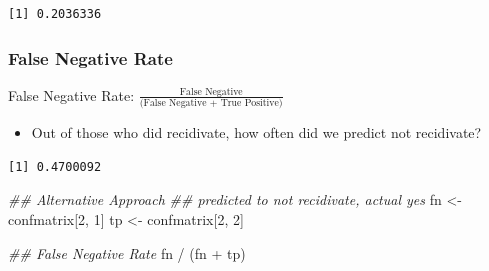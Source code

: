 \documentclass[
  letterpaper,
  DIV=11,
  numbers=noendperiod]{scrreprt}
\newenvironment{Shaded}{\begin{snugshade}}{\end{snugshade}}
\newcommand{\CommentTok}[1]{\textcolor[rgb]{0.37,0.37,0.37}{#1}}
\newcommand{\DecValTok}[1]{\textcolor[rgb]{0.68,0.00,0.00}{#1}}
\newcommand{\DocumentationTok}[1]{\textcolor[rgb]{0.37,0.37,0.37}{\textit{#1}}}
\newcommand{\FunctionTok}[1]{\textcolor[rgb]{0.28,0.35,0.67}{#1}}
\newcommand{\NormalTok}[1]{\textcolor[rgb]{0.00,0.23,0.31}{#1}}
\newcommand{\OtherTok}[1]{\textcolor[rgb]{0.00,0.23,0.31}{#1}}
\newcommand{\SpecialCharTok}[1]{\textcolor[rgb]{0.37,0.37,0.37}{#1}}
\providecommand{\tightlist}{%
  \setlength{\itemsep}{0pt}\setlength{\parskip}{0pt}}\usepackage{longtable,booktabs,array}
\begin{document}
\begin{verbatim}
[1] 0.2036336
\end{verbatim}

\hypertarget{false-negative-rate}{%
\subsubsection{False Negative Rate}\label{false-negative-rate}}

False Negative Rate:
\(\frac{\text{False Negative}}{\text{(False Negative + True Positive)}}\)

\begin{itemize}
\tightlist
\item
  Out of those who did recidivate, how often did we predict not
  recidivate?
\end{itemize}

\begin{Shaded}
\end{Shaded}

\begin{verbatim}
[1] 0.4700092
\end{verbatim}

\begin{Shaded}
\begin{Highlighting}[]
\DocumentationTok{\#\# Alternative Approach}
\DocumentationTok{\#\#  predicted to not recidivate, actual yes}
\NormalTok{fn }\OtherTok{\textless{}{-}}\NormalTok{ confmatrix[}\DecValTok{2}\NormalTok{, }\DecValTok{1}\NormalTok{]}
\NormalTok{tp }\OtherTok{\textless{}{-}}\NormalTok{ confmatrix[}\DecValTok{2}\NormalTok{, }\DecValTok{2}\NormalTok{]}

\DocumentationTok{\#\# False Negative Rate}
\NormalTok{fn }\SpecialCharTok{/}\NormalTok{ (fn }\SpecialCharTok{+}\NormalTok{ tp)}
\end{Highlighting}
\end{Shaded}
\end{document}
